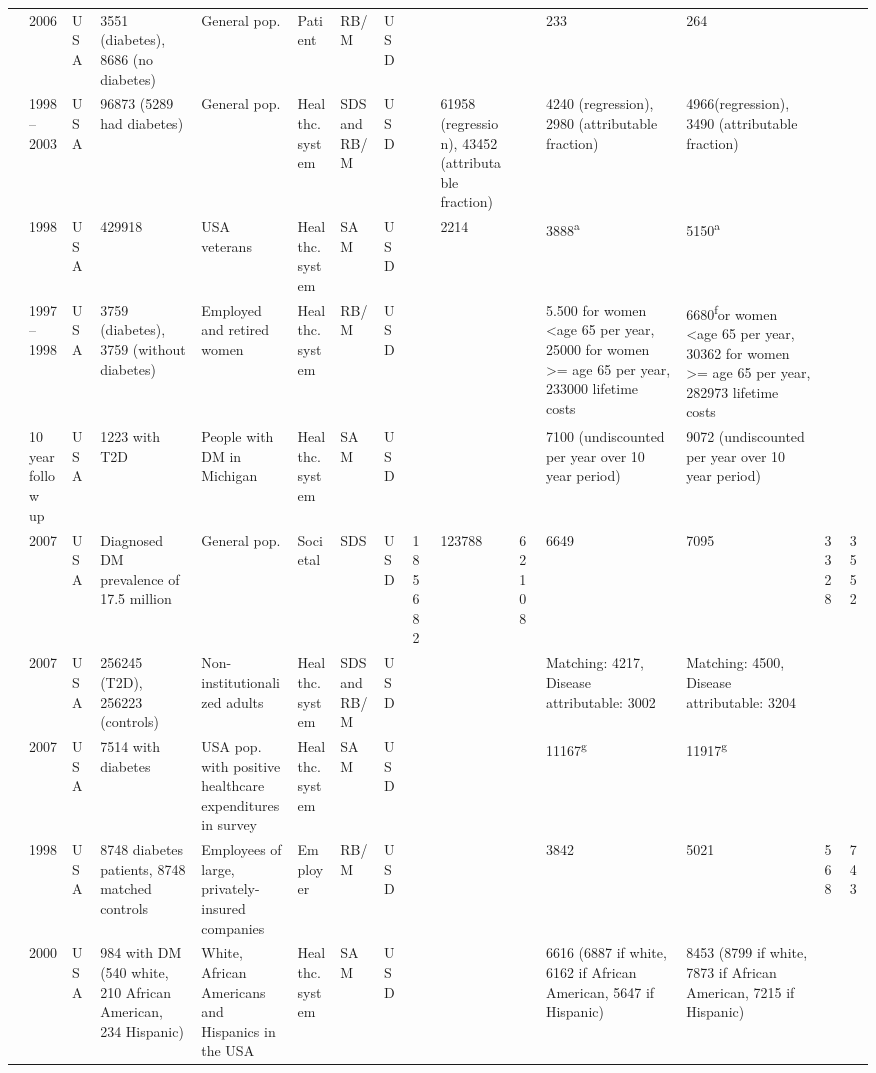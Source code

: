 {\begin{landscape}
\begin{tabularx}{\linewidth}{Z X X Z Z X X X X X X X X Y Y}
\textcite{Rodbard2010b} & 2006 & USA & 3551 (diabetes), 8686 (no diabetes) & General pop. & Patient & RB/M & USD &  &  &  & 233 & 264 &  &  \\
\textcite{Honeycutt2009a} & 1998--2003 & USA & 96873 (5289 had diabetes) & General pop. & Healthc. system & SDS and RB/M & USD &  & 61958 (regression), 43452 (attributable   fraction) &  & 4240 (regression), 2980 (attributable   fraction) & 4966(regression), 3490 (attributable   fraction) &  &  \\
\textcite{Maciejewski2004} & 1998 & USA & 429918 & USA veterans & Healthc. system & SAM & USD &  & 2214 &  & 3888\textsuperscript{a} & 5150\textsuperscript{a} &  &  \\
\textcite{Birnbaum2003c} & 1997--1998 & USA & 3759 (diabetes), 3759 (without diabetes) & Employed and retired women & Healthc. system & RB/M & USD &  &  &  & 5.500 for women \textless age 65 per year, 25000   for women \textgreater= age 65 per year, 233000 lifetime costs & 6680\textsuperscript{f}or women \textless age 65 per year, 30362   for women \textgreater= age 65 per year, 282973 lifetime costs &  &  \\
\textcite{Zhou2005a} & 10 year follow up & USA & 1223 with T2D & People with DM in Michigan & Healthc. system & SAM & USD &  &  &  & 7100 (undiscounted per year over 10 year   period) & 9072 (undiscounted per year over 10 year   period) &  &  \\
\textcite{AmericalDiabetesAssociation2008} & 2007 & USA & Diagnosed DM prevalence of 17.5 million & General pop. & Societal & SDS & USD & 185682 & 123788 & 62108 & 6649 & 7095 & 3328 & 3552 \\
\textcite{Tunceli2010c} & 2007 & USA & 256245 (T2D), 256223 (controls) & Non-institutionalized adults & Healthc. system & SDS and RB/M & USD &  &  &  & Matching: 4217, Disease attributable: 3002 & Matching: 4500, Disease attributable: 3204 &  &  \\
\textcite{Condliffe2014} & 2007 & USA & 7514 with diabetes & USA pop. with positive healthcare   expenditures in survey & Healthc. system & SAM & USD &  &  &  & 11167\textsuperscript{g} & 11917\textsuperscript{g} &  &  \\
\textcite{Ramsey2002a} & 1998 & USA & 8748 diabetes patients, 8748 matched   controls & Employees of large, privately-insured   companies & Employer & RB/M & USD &  &  &  & 3842 & 5021 & 568 & 743 \\
\textcite{Lee2006} & 2000 & USA & 984 with DM (540 white, 210 African   American, 234 Hispanic) & White, African Americans and Hispanics in   the USA & Healthc. system & SAM & USD &  &  &  & 6616 (6887 if white, 6162 if African   American, 5647 if Hispanic) & 8453 (8799 if white, 7873 if African   American, 7215 if Hispanic) &  &  \\

\end{tabularx}
\end{landscape}}
